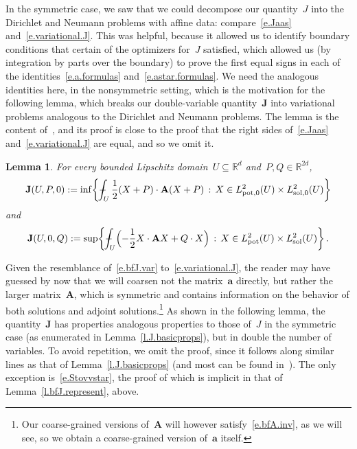 \documentclass[11pt]{article} %
\numberwithin{equation}{section}
\newtheorem{lemma}[theorem]{Lemma}
\theoremstyle{definition}
\newcommand*{\R}{\ensuremath{\mathbb{R}}}
\newcommand*{\Rd}{\ensuremath{\mathbb{R}^d}}
\renewcommand{\a}{\mathbf{a}}
\def\Xint#1{\mathchoice
{\XXint\displaystyle\textstyle{#1}}%
{\XXint\textstyle\scriptstyle{#1}}%
{\XXint\scriptstyle\scriptscriptstyle{#1}}%
{\XXint\scriptscriptstyle\scriptscriptstyle{#1}}%
\!\int}
\def\XXint#1#2#3{{\setbox0=\hbox{$#1{#2#3}{\int}$}
\vcenter{\hbox{$#2#3$}}\kern-.5\wd0}}
\def\fint{\Xint-}
\newcommand{\Lsol}{L^2_{\mathrm{sol}}}
\newcommand{\Lsolo}{L^2_{\mathrm{sol,0}}}
\newcommand{\Lpot}{L^2_{\mathrm{pot}}}
\newcommand{\Lpoto}{L^2_{\mathrm{pot,0}}}
\newcommand{\bfA}{\mathbf{A}}
\newcommand{\bfJ}{\mathbf{J}}
\begin{document}
In the symmetric case, we saw that we could decompose our quantity~$J$ into the Dirichlet and Neumann problems with affine data: compare~\eqref{e.Jaas} and~\eqref{e.variational.J}. This was helpful, because it allowed us to identify boundary conditions that certain of the optimizers for~$J$ satisfied, which allowed us (by integration by parts over the boundary) to prove the first equal signs in each of the identities~\eqref{e.a.formulas} and~\eqref{e.astar.formulas}.
We need the analogous identities here, in the nonsymmetric setting, which is the motivation for the following lemma, which breaks our double-variable quantity~$\bfJ$ into variational problems analogous to the Dirichlet and Neumann problems. The lemma is the content of~\cite[Lemma 10.7]{AKMBook}, and its proof is close to the proof that the right sides of~\eqref{e.Jaas} and~\eqref{e.variational.J} are equal, and so we omit it.

\begin{lemma} \label{l.varyou.varme}
For every bounded Lipschitz domain~$U \subseteq \Rd$ and~$P ,Q \in \R^{2d}$, 
\begin{equation*}  
\bfJ(U,P,0)
: = \inf \biggl\{ 
\fint_{U} \frac12   
(X + P) \cdot \bfA (X + P)
\, : \, X \in  \Lpoto(U) \times  \Lsolo(U)  \biggr\}
\end{equation*}
and
\begin{equation*}  
\bfJ(U,0,Q)
: = \sup \biggl\{ 
\fint_{U} \Bigl( - \frac12 X \cdot \bfA X + Q \cdot X   \Bigr)
\, : \, X \in \Lpot(U)\times \Lsol(U) \biggr\}
\,.
\end{equation*}
\end{lemma}




Given the resemblance of~\eqref{e.bfJ.var} to~\eqref{e.variational.J}, the reader may have guessed by now that we will coarsen not the matrix~$\a$ directly, but rather the larger matrix~$\bfA$, which is symmetric and contains information on the behavior of both solutions and adjoint solutions.\footnote{Our coarse-grained versions of~$\bfA$ will however satisfy~\eqref{e.bfA.inv}, as we will see, so we obtain a coarse-grained version of~$\a$ itself.} 
As shown in the following lemma, the quantity~$\bfJ$ has properties analogous properties to those of~$J$ in the symmetric case (as enumerated in Lemma~\ref{l.J.basicprops}), but in double the number of variables. To avoid repetition, we omit the proof, since it follows along similar lines as that of Lemma~\ref{l.J.basicprops} (and most can be found in~\cite[Chapter 10]{AKMBook}). The only exception is~\eqref{e.Stovvstar}, the proof of which is implicit in that of Lemma~\ref{l.bfJ.represent}, above. 
\end{document}
